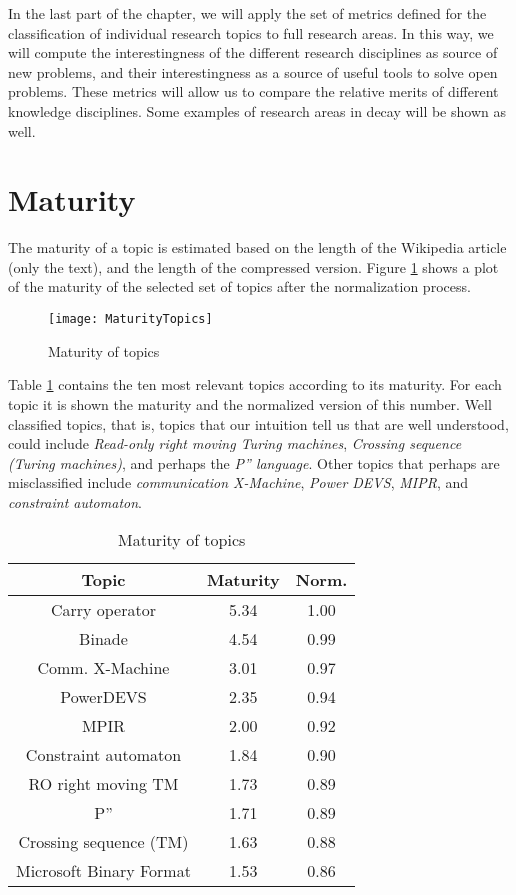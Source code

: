 In the last part of the chapter, we will apply the set of metrics defined for the classification of individual research topics to full research areas. In this way, we will compute the interestingness of the different research disciplines as source of new problems, and their interestingness as a source of useful tools to solve open problems. These metrics will allow us to compare the relative merits of different knowledge disciplines. Some examples of research areas in decay will be shown as well.

\section{Maturity}

The maturity of a topic is estimated based on the length of the Wikipedia article (only the text), and the length of the compressed version. Figure \ref{fig:Maturity-of-Topics} shows a plot of the maturity of the selected set of topics after the normalization process.

\begin{figure}[h]
\centering\texttt{[image: MaturityTopics]}
\caption{\label{fig:Maturity-of-Topics}Maturity of topics}
\end{figure}

Table \ref{tab:Maturity-of-Topics} contains the ten most relevant topics according to its maturity. For each topic it is shown the maturity and the normalized version of this number. Well classified topics, that is, topics that our intuition tell us that are well understood, could include \emph{Read-only right moving Turing machines}, \emph{Crossing sequence (Turing machines)}, and perhaps the \emph{P'' language}. Other topics that perhaps are misclassified include \emph{communication X-Machine}, \emph{Power DEVS}, \emph{MIPR}, and \emph{constraint automaton}.

\begin{table}
\begin{centering}
\begin{tabular}{|c|c|c|}
\hline 
Topic & Maturity & Norm.\tabularnewline
\hline 
\hline 
Carry operator & 5.34 & 1.00\tabularnewline
\hline 
Binade & 4.54 & 0.99\tabularnewline
\hline 
Comm. X-Machine & 3.01 & 0.97\tabularnewline
\hline 
PowerDEVS & 2.35 & 0.94\tabularnewline
\hline 
MPIR & 2.00 & 0.92\tabularnewline
\hline 
Constraint automaton & 1.84 & 0.90\tabularnewline
\hline 
RO right moving TM & 1.73 & 0.89\tabularnewline
\hline 
P'' & 1.71 & 0.89\tabularnewline
\hline 
Crossing sequence (TM) & 1.63 & 0.88\tabularnewline
\hline 
Microsoft Binary Format & 1.53 & 0.86\tabularnewline
\hline 
\end{tabular}
\par\end{centering}

\caption{\label{tab:Maturity-of-Topics}Maturity of topics}
\end{table}

